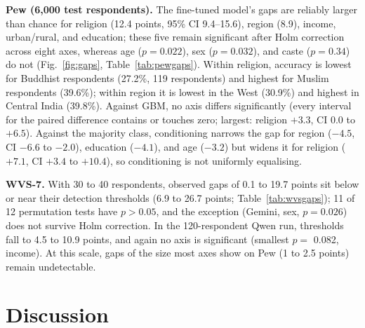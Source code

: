 \documentclass[conference]{IEEEtran}
\begin{document}
\begin{table}[!t]
\caption{Pew fidelity gaps (accuracy points). FT is the fine-tuned model; $p$ is the permutation test of FT's gap; the last column is the paired difference in gap to GBM. Logistic regression is shown in Fig.~\ref{fig:gaps}.}
\label{tab:pewgaps}
\centering
\scriptsize

\end{table}

\textbf{Pew (6{,}000 test respondents).} The fine-tuned model's gaps are reliably larger than chance for religion (12.4 points, 95\% CI 9.4--15.6), region (8.9), income, urban/rural, and education; these five remain significant after Holm correction across eight axes, whereas age ($p=0.022$), sex ($p=0.032$), and caste ($p=0.34$) do not (Fig.~\ref{fig:gaps}, Table~\ref{tab:pewgaps}). Within religion, accuracy is lowest for Buddhist respondents (27.2\%, 119 respondents) and highest for Muslim respondents (39.6\%); within region it is lowest in the West (30.9\%) and highest in Central India (39.8\%). Against GBM, no axis differs significantly (every interval for the paired difference contains or touches zero; largest: religion $+3.3$, CI 0.0 to $+6.5$). Against the majority class, conditioning narrows the gap for region ($-4.5$, CI $-6.6$ to $-2.0$), education ($-4.1$), and age ($-3.2$) but widens it for religion ($+7.1$, CI $+3.4$ to $+10.4$), so conditioning is not uniformly equalising.

\begin{table}[!t]
\caption{WVS-7 subgroup gaps in accuracy points, with permutation $p$ in parentheses and the detection threshold $\mathrm{Null}_{95}$ in brackets. Column headers give the number of respondents.}
\label{tab:wvsgaps}
\centering
\scriptsize

\end{table}

\textbf{WVS-7.} With 30 to 40 respondents, observed gaps of 0.1 to 19.7 points sit below or near their detection thresholds (6.9 to 26.7 points; Table~\ref{tab:wvsgaps}); 11 of 12 permutation tests have $p>0.05$, and the exception (Gemini, sex, $p=0.026$) does not survive Holm correction. In the 120-respondent Qwen run, thresholds fall to 4.5 to 10.9 points, and again no axis is significant (smallest $p=$ 0.082, income). At this scale, gaps of the size most axes show on Pew (1 to 2.5 points) remain undetectable.

\section{Discussion}
\end{document}
